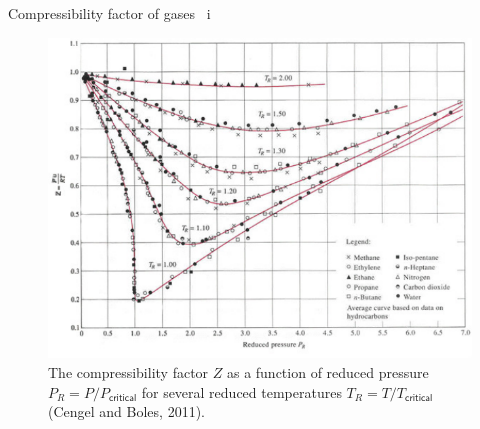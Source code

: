 %
%
\begin{frame}{Compressibility factor of gases \, i}

\begin{figure}
\begin{centering}
\includegraphics[height=0.8\textheight]{figures/activity-models/compressibility-factor-several-gases}
\par\end{centering}
\caption{{\footnotesize{}The compressibility factor $Z$ as a function of reduced pressure $P_{R} = P/P_{\mathsf{critical}}$
for several reduced temperatures $T_{R} = T/T_{\mathsf{critical}}$ (Cengel and Boles, 2011).}}
\end{figure}

\end{frame}
%
%
